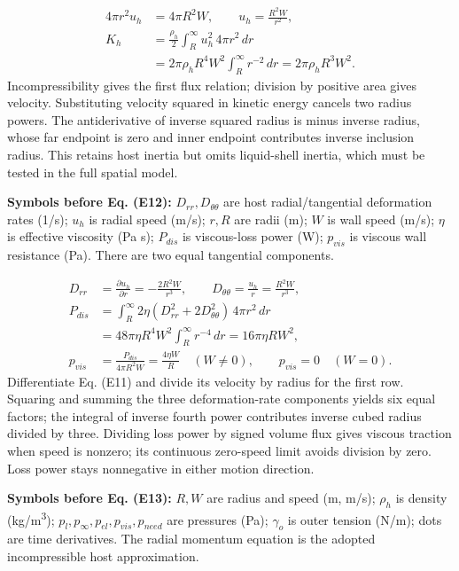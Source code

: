 \documentclass[10pt,a4paper]{article}
\begin{document}
{\small\begin{align*}
4\pi r^2u_h&=4\pi R^2W,\qquad u_h=\frac{R^2W}{r^2},\\
K_h&=\frac{\rho_h}{2}\int_R^\infty u_h^2\,4\pi r^2\,dr\\
&=2\pi\rho_hR^4W^2\int_R^\infty r^{-2}\,dr
=2\pi\rho_hR^3W^2. \tag{E11}
\end{align*}}
Incompressibility gives the first flux relation; division by positive area gives velocity. Substituting velocity squared in kinetic energy cancels two radius powers. The antiderivative of inverse squared radius is minus inverse radius, whose far endpoint is zero and inner endpoint contributes inverse inclusion radius. This retains host inertia but omits liquid-shell inertia, which must be tested in the full spatial model.

\textbf{Symbols before Eq. (E12):} $D_{rr},D_{\theta\theta}$ are host radial/tangential deformation rates (1/s); $u_h$ is radial speed (m/s); $r,R$ are radii (m); $W$ is wall speed (m/s); $\eta$ is effective viscosity (Pa s); $P_{dis}$ is viscous-loss power (W); $p_{vis}$ is viscous wall resistance (Pa). There are two equal tangential components.

{\small\begin{align*}
D_{rr}&=\frac{\partial u_h}{\partial r}=-\frac{2R^2W}{r^3},\qquad
D_{\theta\theta}=\frac{u_h}{r}=\frac{R^2W}{r^3},\\
P_{dis}&=\int_R^\infty 2\eta(D_{rr}^2+2D_{\theta\theta}^2)\,4\pi r^2\,dr\\
&=48\pi\eta R^4W^2\int_R^\infty r^{-4}\,dr
=16\pi\eta R W^2,\\
p_{vis}&=\frac{P_{dis}}{4\pi R^2W}=\frac{4\eta W}{R}\quad(W\ne0),
\qquad p_{vis}=0\quad(W=0). \tag{E12}
\end{align*}}
Differentiate Eq. (E11) and divide its velocity by radius for the first row. Squaring and summing the three deformation-rate components yields six equal factors; the integral of inverse fourth power contributes inverse cubed radius divided by three. Dividing loss power by signed volume flux gives viscous traction when speed is nonzero; its continuous zero-speed limit avoids division by zero. Loss power stays nonnegative in either motion direction.

\textbf{Symbols before Eq. (E13):} $R,W$ are radius and speed (m, m/s); $\rho_h$ is density (kg/m\textsuperscript{3}); $p_l,p_\infty,p_{el},p_{vis},p_{need}$ are pressures (Pa); $\gamma_o$ is outer tension (N/m); dots are time derivatives. The radial momentum equation is the adopted incompressible host approximation.
\end{document}
